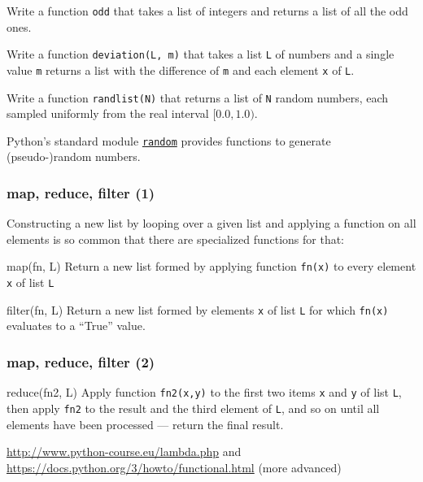 \documentclass[english,serif,mathserif,xcolor=pdftex,dvipsnames,table]{beamer}
\begin{document}
\begin{frame}[fragile]
  \begin{exercise*}[3.C]
    Write a function \texttt{odd} that takes a list of integers and
    returns a list of all the odd ones.
  \end{exercise*}

  \+
  \begin{exercise*}[3.D]
    Write a function \texttt{deviation(L, m)} that takes a list \texttt{L} of
    numbers and a single value \texttt{m} returns a list with the difference of
    \texttt{m} and each element \texttt{x} of \texttt{L}.
  \end{exercise*}

  \+
  \begin{exercise*}[3.E]
    Write a function \texttt{randlist(N)} that returns a list of
    \texttt{N} random numbers, each sampled uniformly from the real
    interval $[0.0, 1.0)$.

    \+
    Python's standard module
    \href{https://docs.python.org/3/library/random.html}{\texttt{random}}
    provides functions to generate (pseudo-)random numbers.
  \end{exercise*}
\end{frame}


\begin{frame}
  \frametitle{map, reduce, filter (1)}

  Constructing a new list by looping over a given list and applying a function
  on all elements is so common that there are specialized functions for that:

  \begin{describe}{map(fn, L)}
    Return a new list formed by applying function \texttt{fn(x)} to every
    element \texttt{x} of list \texttt{L}
  \end{describe}

  \+
  \begin{describe}{filter(fn, L)}
    Return a new list formed by elements \texttt{x} of list \texttt{L} for which
    \texttt{fn(x)} evaluates to a ``True'' value.
  \end{describe}
\end{frame}

\begin{frame}
  \frametitle{map, reduce, filter (2)}

  \begin{describe}{reduce(fn2, L)}
    Apply function \texttt{fn2(x,y)} to the first two items \texttt{x} and
    \texttt{y} of list \texttt{L}, then apply \texttt{fn2} to the result and the
    third element of \texttt{L}, and so on until all elements have been
    processed --- return the final result.
  \end{describe}

  \+
  \begin{seealso}
    \url{http://www.python-course.eu/lambda.php}
    and \url{https://docs.python.org/3/howto/functional.html} (more advanced)
  \end{seealso}
\end{frame}
\end{document}
